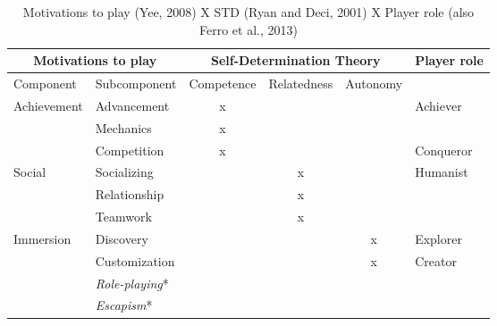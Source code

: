 \begin{table}[]
\centering
\caption{Motivations to play (Yee, 2008) X STD (Ryan and Deci, 2001) X Player role (also Ferro et al., 2013)
}
\label{my-label}
\begin{tabular}{|l|l|c|c|c|l|}
\hline
\multicolumn{2}{|c|}{\textbf{Motivations to play}} & \multicolumn{3}{c|}{\textbf{Self-Determination Theory}} & \multicolumn{1}{c|}{\textbf{Player role}} \\ \hline
Component & Subcomponent & \multicolumn{1}{l|}{Competence} & \multicolumn{1}{l|}{Relatedness} & \multicolumn{1}{l|}{Autonomy} &  \\ \hline
\multirow{3}{*}{Achievement} & Advancement & x &  &  & \multirow{2}{*}{Achiever} \\ \cline{2-5}
 & Mechanics & x &  &  &  \\ \cline{2-6} 
 & Competition & x &  &  & Conqueror \\ \hline
\multirow{3}{*}{Social} & Socializing &  & x &  & \multirow{3}{*}{Humanist} \\ \cline{2-5}
 & Relationship &  & x &  &  \\ \cline{2-5}
 & Teamwork &  & x &  &  \\ \hline
\multirow{4}{*}{Immersion} & Discovery &  &  & x & Explorer \\ \cline{2-6} 
 & Customization &  &  & x & Creator \\ \cline{2-6} 
 & \textit{Role-playing}* &  &  &  &  \\ \cline{2-6} 
 & \textit{Escapism}* &  &  &  &  \\ \hline
\end{tabular}
\end{table}


